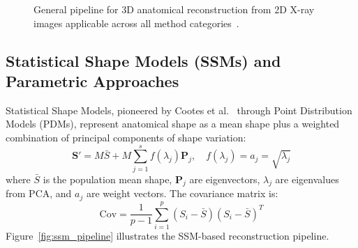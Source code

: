 \documentclass[10pt,twocolumn,a4paper]{article}
\begin{document}
\begin{figure}[h]
\centering
{}
\caption{General pipeline for 3D anatomical reconstruction from 2D X-ray
images applicable across all method categories~\cite{maken2023}.}
\label{fig:general_pipeline}
\end{figure}

\subsection{Statistical Shape Models (SSMs) and Parametric Approaches}
\label{sec:past:ssm}

Statistical Shape Models, pioneered by Cootes et al.~\cite{cootes1992} through
Point Distribution Models (PDMs), represent anatomical shape as a mean shape
plus a weighted combination of principal components of shape variation:
\begin{equation}
\mathbf{S}' = M\bar{S} + M\sum_{j=1}^{s} f(\lambda_j)\mathbf{P}_j,\quad
f(\lambda_j) = a_j = \sqrt{\lambda_j}
\label{eq:ssm}
\end{equation}
where $\bar{S}$ is the population mean shape, $\mathbf{P}_j$ are eigenvectors,
$\lambda_j$ are eigenvalues from PCA, and $a_j$ are weight vectors. The
covariance matrix is:
\begin{equation}
\text{Cov} = \frac{1}{p-1}\sum_{i=1}^{p}(S_i - \bar{S})(S_i - \bar{S})^T
\label{eq:cov}
\end{equation}
Figure~\ref{fig:ssm_pipeline} illustrates the SSM-based reconstruction pipeline.
\end{document}
